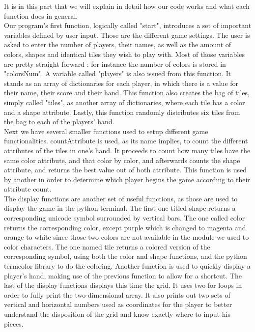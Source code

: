 \documentclass{article}
\begin{document}
It is in this part that we will explain in detail how our code works and what each function does in general. \\
Our program's first function, logically called "start", introduces a set of important variables defined by user input. Those are the different game settings. The user is asked to enter the number of players, their names, as well as the amount of colors, shapes and identical tiles they wish to play with. Most of those variables are pretty straight forward : for instance the number of colors is stored in "colorsNum". A variable called "players" is also issued from this function. It stands as an array of dictionaries for each player, in which there is a value for their name, their score and their hand. This function also creates the bag of tiles, simply called "tiles", as another array of dictionaries, where each tile has a color and a shape attribute. Lastly, this function randomly distributes six tiles from the bag to each of the players' hand. \\
Next we have several smaller functions used to setup different game functionalities. countAttribute is used, as its name implies, to count the different attributes of the tiles in one's hand. It proceeds to count how many tiles have the same color attribute, and that color by color, and afterwards counts the shape attribute, and returns the best value out of both attribute. This function is used by another in order to determine which player begins the game according to their attribute count.\\
The display functions are another set of useful functions, as those are used to display the game in the python terminal. The first one titled shape returns a corresponding unicode symbol surrounded by vertical bars. The one called color returns the corresponding color, except purple which is changed to magenta and orange to white since those two colors are not available in the module we used to color characters. The one named tile returns a colored version of the corresponding symbol, using both the color and shape functions, and the python termcolor library to do the coloring. Another function is used to quickly display a player's hand, making use of the previous function to allow for a shortcut. The last of the display functions displays this time the grid. It uses two for loops in order to fully print the two-dimensional array. It also prints out two sets of vertical and horizontal numbers used as coordinates for the player to better understand the disposition of the grid and know exactly where to input his pieces. \\
\end{document}
